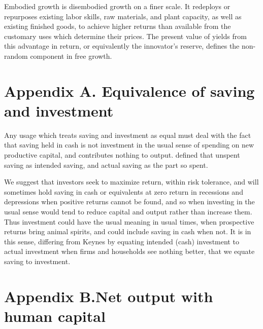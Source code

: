 \documentclass[a4paper,fleqn]{latex_styles/cas-sc}
\begin{document}
Embodied growth is disembodied growth on a finer scale. It redeploys or
repurposes existing labor skills, raw materials, and plant capacity, as
well as existing finished goods, to achieve higher returns than
available from the customary uses which determine their prices. The
present value of yields from this advantage in return, or equivalently
the innovator's reserve, defines the non-random component in free growth.

\appendix
\renewcommand{\theequation}{A.\arabic{equation}}
\setcounter{equation}{0}

\hypertarget{appendix-a}{
\section*{Appendix A. \hspace{0.5em}Equivalence of saving and investment}\label{appendix-a}
}

Any usage which treats saving and investment as equal must deal with the fact that saving held in cash is not investment in the usual sense of spending on new productive capital, and contributes nothing to output. \cite{keynesGeneralTheoryEmployment1936} defined that unspent saving as intended saving, and actual saving as the part so spent.

We suggest that investors seek to maximize return, within risk tolerance, and will sometimes hold saving in cash or equivalents at zero return in recessions and depressions when positive returns cannot be found, and so when investing in the usual sense would tend to reduce capital and output rather than increase them. Thus investment could have the usual meaning in usual times, when prospective returns bring animal spirits, and could include saving in cash when not. It is in this sense, differing from Keynes by equating intended (cash) investment to actual investment when firms and households see nothing better, that we equate saving to investment.

\renewcommand{\theequation}{B.\arabic{equation}}
\setcounter{equation}{0}

\hypertarget{appendix}{%
\section*{Appendix B.\hspace{0.5em}Net output with human
capital}\label{appendix}}
\end{document}
